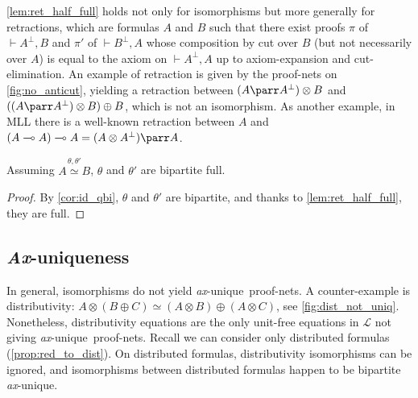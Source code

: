 \documentclass{lmcs}
\newcommand*{\orth}{^\perp} %
\newcommand*{\tens}{\otimes} %
\newcommand*{\lolipop}{\multimap} %
\renewcommand*{\fCenter}{\vdash} %
\newcommand*{\iso}{\mathrel{\simeq}} %
\newcommand*{\Eu}{\mathcal{L}} %
\newcommand{\isoproofs}[4]{\overset{\ensuremath{#3,#4}}{#1\iso #2}}
\newcommand*{\unique}{\textit{ax}-unique}
\newcommand*{\Unique}{\textit{Ax}-unique}
\begin{document}
\begin{rem}
\label{rem:ret_half_full}
\autoref{lem:ret_half_full} holds not only for isomorphisms but more generally for retractions, which are formulas $A$ and $B$ such that there exist proofs $\pi$ of $\fCenter A\orth,B$ and $\pi'$ of $\fCenter B\orth,A$ whose composition by cut over $B$ (but not necessarily over $A$) is equal to the axiom on $\fCenter A\orth,A$ up to axiom-expansion and cut-elimination.
An example of retraction is given by the proof-nets on \autoref{fig:no_anticut}, yielding a retraction between $(A\parr A\orth)\tens B$ and $((A\parr A\orth)\tens B)\oplus B$, which is not an isomorphism.
As another example, in MLL there is a well-known retraction between $A$ and $(A\lolipop A)\lolipop A = (A\tens A\orth)\parr A$.
\end{rem}

\begin{thm}
\label{th:iso_bipartite}
Assuming $\isoproofs{A}{B}{\theta}{\theta'}$, $\theta$ and $\theta'$ are bipartite full.
\end{thm}
\begin{proof}
By \autoref{cor:id_qbi}, $\theta$ and $\theta'$ are bipartite, and thanks to \autoref{lem:ret_half_full}, they are full.
\end{proof}

\subsection{\Unique ness}
\label{sec:dist_bi_u}

In general, isomorphisms do not yield \unique\ proof-nets.
A counter-example is distributivity: $A\tens(B\oplus C)\iso (A\tens B)\oplus(A\tens C)$, see \autoref{fig:dist_not_uniq}.
Nonetheless, distributivity equations are the only unit-free equations in $\Eu$ not giving \unique\ proof-nets.
Recall we can consider only distributed formulas (\autoref{prop:red_to_dist}).
On distributed formulas, distributivity isomorphisms can be ignored, and isomorphisms between distributed formulas happen to be bipartite \unique.
\end{document}
